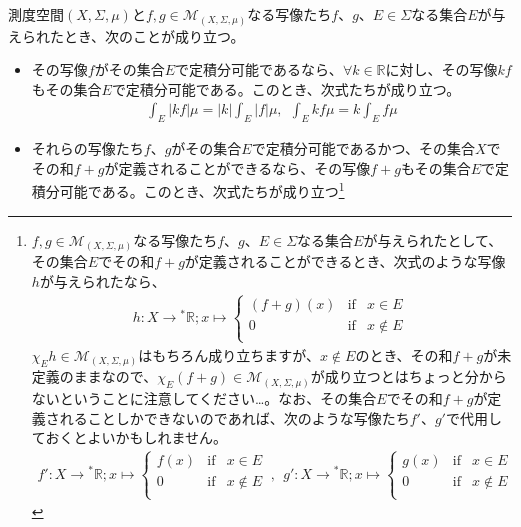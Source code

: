 \documentclass[dvipdfmx]{jsarticle}
\begin{document}
\begin{thm}\label{4.6.1.32}
測度空間$(X,\varSigma,\mu)$と$f,g \in \mathcal{M}_{(X,\varSigma,\mu)}$なる写像たち$f$、$g$、$E \in \varSigma$なる集合$E$が与えられたとき、次のことが成り立つ。
\begin{itemize}
\item
  その写像$f$がその集合$E$で定積分可能であるなら、$\forall k \in \mathbb{R}$に対し、その写像$kf$もその集合$E$で定積分可能である。このとき、次式たちが成り立つ。
\begin{align*}
\int_{E} {|kf|\mu} = |k|\int_{E} {|f|\mu},\ \ \int_{E} {kf\mu} = k\int_{E} {f\mu}
\end{align*}
\item
  それらの写像たち$f$、$g$がその集合$E$で定積分可能であるかつ、その集合$X$でその和$f + g$が定義されることができるなら、その写像$f + g$もその集合$E$で定積分可能である。このとき、次式たちが成り立つ\footnote{$f,g \in \mathcal{M}_{(X,\varSigma,\mu)}$なる写像たち$f$、$g$、$E \in \varSigma$なる集合$E$が与えられたとして、その集合$E$でその和$f + g$が定義されることができるとき、次式のような写像$h$が与えられたなら、
\begin{align*}
h:X \rightarrow{}^{*}\mathbb{R};x \mapsto \left\{ \begin{matrix}
  (f + g)(x) & \mathrm{if} & x \in E \\
  0 & \mathrm{if} & x \notin E \\
\end{matrix} \right.\ 
\end{align*}
  $\chi_{E}h \in \mathcal{M}_{(X,\varSigma,\mu)}$はもちろん成り立ちますが、$x \notin E$のとき、その和$f + g$が未定義のままなので、$\chi_{E}(f + g) \in \mathcal{M}_{(X,\varSigma,\mu)}$が成り立つとはちょっと分からないということに注意してください…。なお、その集合$E$でその和$f + g$が定義されることしかできないのであれば、次のような写像たち$f'$、$g'$で代用しておくとよいかもしれません。
\begin{align*}
f':X \rightarrow{}^{*}\mathbb{R};x \mapsto \left\{ \begin{matrix}
  f(x) & \mathrm{if} & x \in E \\
  0 & \mathrm{if} & x \notin E \\
\end{matrix} \right.\ ,\ \ g':X \rightarrow{}^{*}\mathbb{R};x \mapsto \left\{ \begin{matrix}
  g(x) & \mathrm{if} & x \in E \\
  0 & \mathrm{if} & x \notin E \\
\end{matrix} \right.\ 

\end{align*}}
\end{itemize}
\end{thm}
\end{document}
